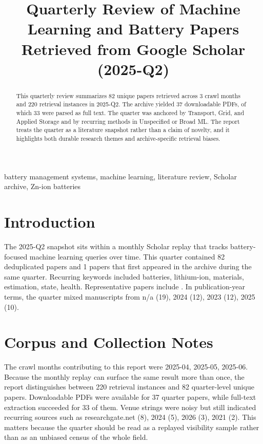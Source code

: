 \documentclass[conference]{IEEEtran}
\begin{document}
\title{ Quarterly Review of Machine Learning and Battery Papers Retrieved from Google Scholar (2025-Q2) }

\author{
}

\maketitle

\begin{abstract}
This quarterly review summarizes 82 unique papers retrieved across 3 crawl months and 220 retrieval instances in 2025-Q2. The archive yielded 37 downloadable PDFs, of which 33 were parsed as full text. The quarter was anchored by Transport, Grid, and Applied Storage and by recurring methods in Unspecified or Broad ML. The report treats the quarter as a literature snapshot rather than a claim of novelty, and it highlights both durable research themes and archive-specific retrieval biases.
\end{abstract}

\begin{IEEEkeywords}
battery management systems, machine learning, literature review, Scholar archive, Zn-ion batteries
\end{IEEEkeywords}

\section{Introduction}
The 2025-Q2 snapshot sits within a monthly Scholar replay that tracks battery-focused machine learning queries over time. This quarter contained 82 deduplicated papers and 1 papers that first appeared in the archive during the same quarter. Recurring keywords included batteries, lithium-ion, materials, estimation, state, health. Representative papers include \cite{stateestimationof2023,textminingfor2022,recentadvancesin2025,section02assessingna}. In publication-year terms, the quarter mixed manuscripts from n/a (19), 2024 (12), 2023 (12), 2025 (10).

\section{Corpus and Collection Notes}
The crawl months contributing to this report were 2025-04, 2025-05, 2025-06. Because the monthly replay can surface the same result more than once, the report distinguishes between 220 retrieval instances and 82 quarter-level unique papers. Downloadable PDFs were available for 37 quarter papers, while full-text extraction succeeded for 33 of them. Venue strings were noisy but still indicated recurring sources such as researchgate.net (8), 2024 (5), 2026 (3), 2021 (2). This matters because the quarter should be read as a replayed visibility sample rather than as an unbiased census of the whole field.
\end{document}
